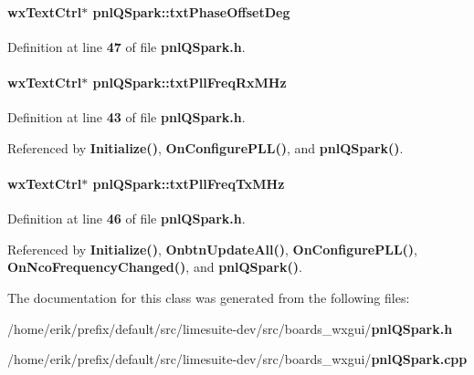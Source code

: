 \paragraph[{txt\+Phase\+Offset\+Deg}]{\setlength{\rightskip}{0pt plus 5cm}wx\+Text\+Ctrl$\ast$ pnl\+Q\+Spark\+::txt\+Phase\+Offset\+Deg}\label{classpnlQSpark_afbf7db2b6835c8a86eecf361d520cbd3}


Definition at line {\bf 47} of file {\bf pnl\+Q\+Spark.\+h}.

\paragraph[{txt\+Pll\+Freq\+Rx\+M\+Hz}]{\setlength{\rightskip}{0pt plus 5cm}wx\+Text\+Ctrl$\ast$ pnl\+Q\+Spark\+::txt\+Pll\+Freq\+Rx\+M\+Hz}\label{classpnlQSpark_a15f10b42b96e9126e8664d2a1f1605df}


Definition at line {\bf 43} of file {\bf pnl\+Q\+Spark.\+h}.



Referenced by {\bf Initialize()}, {\bf On\+Configure\+P\+L\+L()}, and {\bf pnl\+Q\+Spark()}.

\paragraph[{txt\+Pll\+Freq\+Tx\+M\+Hz}]{\setlength{\rightskip}{0pt plus 5cm}wx\+Text\+Ctrl$\ast$ pnl\+Q\+Spark\+::txt\+Pll\+Freq\+Tx\+M\+Hz}\label{classpnlQSpark_a9dbc3d93e8fc0124a93bd1dac996d7bc}


Definition at line {\bf 46} of file {\bf pnl\+Q\+Spark.\+h}.



Referenced by {\bf Initialize()}, {\bf Onbtn\+Update\+All()}, {\bf On\+Configure\+P\+L\+L()}, {\bf On\+Nco\+Frequency\+Changed()}, and {\bf pnl\+Q\+Spark()}.



The documentation for this class was generated from the following files\+:\begin{DoxyCompactItemize}
\item 
/home/erik/prefix/default/src/limesuite-\/dev/src/boards\+\_\+wxgui/{\bf pnl\+Q\+Spark.\+h}\item 
/home/erik/prefix/default/src/limesuite-\/dev/src/boards\+\_\+wxgui/{\bf pnl\+Q\+Spark.\+cpp}\end{DoxyCompactItemize}
